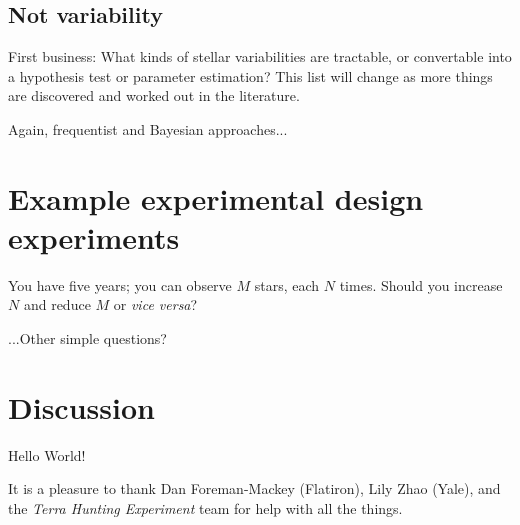 \documentclass[modern]{aastex63}
\newcommand{\foreign}[1]{\textsl{#1}}
\newcommand{\project}[1]{\textsl{#1}}
\begin{document}
\subsection{Not variability}

First business: What kinds of stellar variabilities are tractable, or
convertable into a hypothesis test or parameter estimation? This list
will change as more things are discovered and worked out in the
literature.

Again, frequentist and Bayesian approaches...

\section{Example experimental design experiments}

You have five years; you can observe $M$ stars, each $N$ times. Should
you increase $N$ and reduce $M$ or \foreign{vice versa}?

...Other simple questions?

\section{Discussion}

Hello World!

\acknowledgments

It is a pleasure to thank
  Dan Foreman-Mackey (Flatiron),
  Lily Zhao (Yale),
  and
  the \project{Terra Hunting Experiment} team
for help with all the things.

\software{
}



\end{document}
